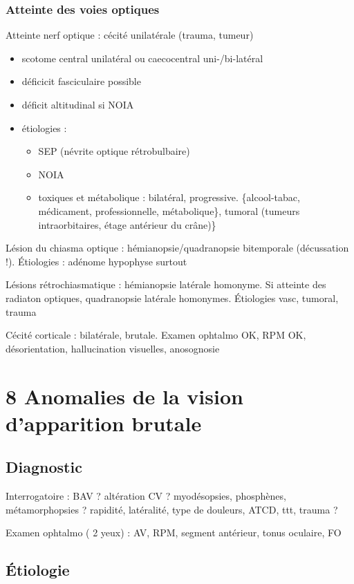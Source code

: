 \documentclass[11pt]{article}
\begin{document}
\subsubsection{Atteinte des voies optiques}
\label{sec:org582df34}
Atteinte nerf optique : cécité unilatérale (trauma, tumeur) 
\begin{itemize}
\item scotome central unilatéral ou caecocentral uni-/bi-latéral
\item déficicit fasciculaire possible
\item déficit altitudinal si \gls{NOIA}
\item étiologies :
\begin{itemize}
\item SEP (névrite optique rétrobulbaire)
\item NOIA
\item toxiques et métabolique : bilatéral, progressive. \{alcool-tabac, médicament,
professionnelle, métabolique\}, tumoral (tumeurs intraorbitaires, étage
antérieur du crâne)\}
\end{itemize}
\end{itemize}

Lésion du chiasma optique : hémianopsie/quadranopsie bitemporale (décussation
!). Étiologies : adénome hypophyse surtout

Lésions rétrochiasmatique : hémianopsie latérale homonyme. Si atteinte des
radiaton optiques, quadranopsie latérale homonymes. Étiologies vasc, tumoral,
trauma

Cécité corticale : bilatérale, brutale. Examen ophtalmo OK, RPM OK,
désorientation, hallucination visuelles, anosognosie
\section{8 Anomalies de la vision d'apparition brutale}
\label{sec:org31154c9}
\subsection{Diagnostic}
\label{sec:org6cf8026}
Interrogatoire : BAV ? altération CV ? myodésopsies,  phosphènes,
métamorphopsies ? rapidité, latéralité, type de douleurs, ATCD, ttt, trauma ?

Examen ophtalmo ( 2 yeux) : AV, RPM, segment antérieur, tonus oculaire, FO

\subsection{Étiologie}
\label{sec:org009604a}
\end{document}
